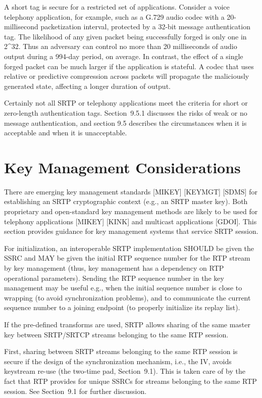 \documentclass{article}
\begin{document}
A short tag is secure for a restricted set of applications.  Consider a voice telephony application, for example, such as a G.729 audio codec with a 20-millisecond packetization interval, protected by a 32-bit message authentication tag.  The likelihood of any given packet being successfully forged is only one in 2\textasciicircum{}32.  Thus an adversary can control no more than 20 milliseconds of audio output during a 994-day period, on average.  In contrast, the effect of a single forged packet can be much larger if the application is stateful.  A codec that uses relative or predictive compression across packets will propagate the maliciously generated state, affecting a longer duration of output.

Certainly not all SRTP or telephony applications meet the criteria for short or zero-length authentication tags.  Section~9.5.1 discusses the risks of weak or no message authentication, and section 9.5 describes the circumstances when it is acceptable and when it is unacceptable.

\section{Key Management Considerations}

There are emerging key management standards [MIKEY] [KEYMGT] [SDMS] for establishing an SRTP cryptographic context (e.g., an SRTP master key).  Both proprietary and open-standard key management methods are likely to be used for telephony applications [MIKEY] [KINK] and multicast applications [GDOI].  This section provides guidance for key management systems that service SRTP session.

For initialization, an interoperable SRTP implementation SHOULD be given the SSRC and MAY be given the initial RTP sequence number for the RTP stream by key management (thus, key management has a dependency on RTP operational parameters).  Sending the RTP sequence number in the key management may be useful e.g., when the initial sequence number is close to wrapping (to avoid synchronization problems), and to communicate the current sequence number to a joining endpoint (to properly initialize its replay list).

If the pre-defined transforms are used, SRTP allows sharing of the same master key between SRTP/SRTCP streams belonging to the same RTP session.

First, sharing between SRTP streams belonging to the same RTP session is secure if the design of the synchronization mechanism, i.e., the IV, avoids keystream re-use (the two-time pad, Section~9.1).  This is taken care of by the fact that RTP provides for unique SSRCs for streams belonging to the same RTP session.  See Section~9.1 for further discussion.
\end{document}
